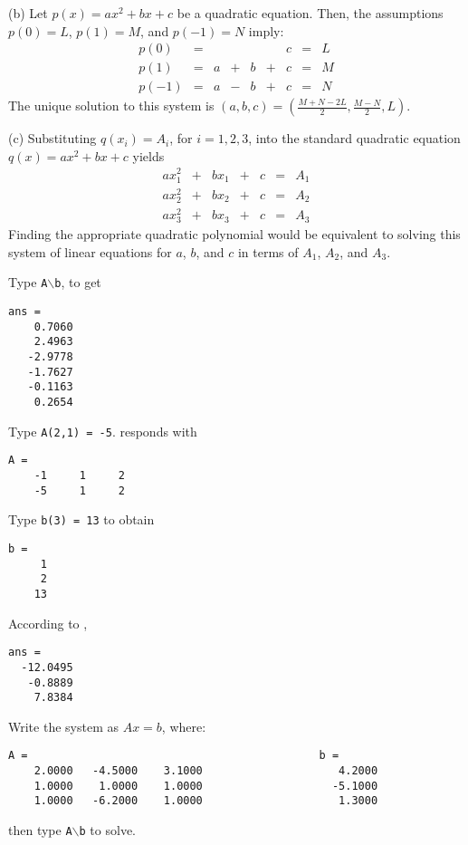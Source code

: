 (b) Let $p(x) = ax^2 + bx + c$ be a quadratic equation.  Then, the
assumptions $p(0) = L$, $p(1) = M$, and $p(-1) = N$ imply:
\[
\begin{array}{lrrrrrrrr}
p(0) & = & & & & & c & = & L \\
p(1) & = & a & + & b & + & c & = & M \\
p(-1) & = & a & - & b & + & c & = & N\end{array}
\]
The unique solution to this system is $(a,b,c) =
(\frac{M + N - 2L}{2},\frac{M - N}{2},L)$.

(c) Substituting $q(x_i) = A_i$, for $i = 1,2,3$, into the standard
quadratic equation $q(x) = ax^2 + bx + c$ yields
\[
\begin{array}{ccccccc}
ax_1^2 & + & bx_1 & + & c & = & A_1 \\
ax_2^2 & + & bx_2 & + & c & = & A_2 \\
ax_3^2 & + & bx_3 & + & c & = & A_3\end{array}
\]
Finding the appropriate quadratic polynomial would be equivalent to
solving this system of linear equations for $a$, $b$, and $c$ in
terms of $A_1$, $A_2$, and $A_3$.




Type {\tt A}$\backslash${\tt b}, to get
\begin{verbatim}
ans =
    0.7060
    2.4963
   -2.9778
   -1.7627
   -0.1163
    0.2654
\end{verbatim}

 Type {\tt A(2,1) = -5}.  \Matlab responds with
\begin{verbatim}
A =
    -1     1     2
    -5     1     2
\end{verbatim}

\newpage
{} Type {\tt b(3) = 13} to obtain
\begin{verbatim}
b =
     1
     2
    13
\end{verbatim}

 \ans According to \Matlabp,
\begin{verbatim}
ans =
  -12.0495
   -0.8889
    7.8384
\end{verbatim}
\soln Write the system as $Ax = b$, where:
\begin{verbatim}
A =                                             b = 
    2.0000   -4.5000    3.1000                     4.2000
    1.0000    1.0000    1.0000                    -5.1000
    1.0000   -6.2000    1.0000                     1.3000
\end{verbatim}
then type {\tt A}$\backslash${\tt b} to solve.

